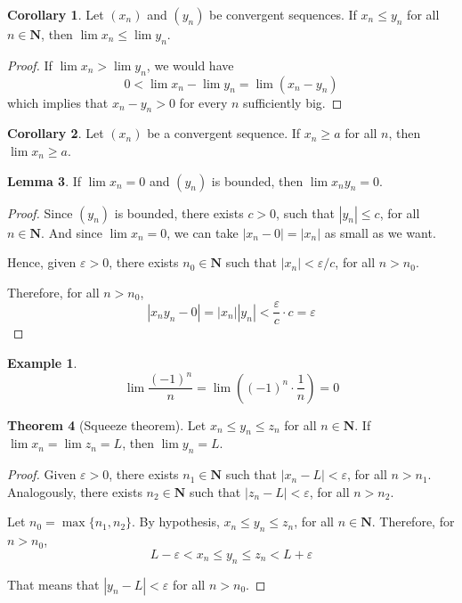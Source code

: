 \documentclass[tikz,12pt,a4paper]{article}
\theoremstyle{definition}
\newtheorem{theorem}{Theorem}[section]
\newtheorem{corollary}[theorem]{Corollary}
\newtheorem{lemma}[theorem]{Lemma}
\newtheorem{example}{Example}[section]
\begin{document}
\begin{corollary}
	Let $(x_n)$ and $(y_n)$ be convergent sequences. If $x_n \leq y_n$ for all $n \in \textbf{N}$, then $\lim x_n \leq \lim y_n$.
\end{corollary}
\begin{proof}
	If $\lim x_n > \lim y_n$, we would have \[ 0 < \lim x_n - \lim y_n = \lim (x_n - y_n) \] which implies that $x_n - y_n > 0$ for every $n$ sufficiently big.
\end{proof}

\begin{corollary}
	Let $(x_n)$ be a convergent sequence. If $x_n \geq a$ for all $n$, then $\lim x_n \geq a$.
\end{corollary}

\begin{lemma}\label{zeroandbound}
	If $\lim x_n = 0$ and $(y_n)$ is bounded, then $\lim x_n y_n = 0$.
\end{lemma}

\begin{proof}
	Since $(y_n)$ is bounded, there exists $c > 0$, such that $|y_n| \leq c$, for all $n \in \textbf{N}$. And since $\lim x_n = 0$, we can take $|x_n - 0| = |x_n|$ as small as we want.
	
	Hence, given $\varepsilon > 0$, there exists $n_0 \in \textbf{N}$ such that $|x_n| < \varepsilon / c$, for all $n > n_0$.
	
	Therefore, for all $n > n_0$, 
	\[
		|x_n y_n - 0| = |x_n| |y_n| < \frac{\varepsilon}{c} \cdot c = \varepsilon
	\]
\end{proof}

\begin{example}
	\[ \lim \frac{(-1)^n}{n} = \lim \left( (-1)^n \cdot \frac{1}{n} \right) = 0 \]
\end{example}

\begin{theorem}[Squeeze theorem]
	Let $x_n \leq y_n \leq z_n$ for all $n \in \textbf{N}$. If $\lim x_n = \lim z_n = L$, then $\lim y_n = L$.
\end{theorem}

\begin{proof}
	Given $\varepsilon > 0$, there exists $n_1 \in \textbf{N}$ such that $|x_n - L| < \varepsilon$, for all $n > n_1$. Analogously, there exists $n_2 \in \textbf{N}$ such that $|z_n - L| < \varepsilon$, for all $n > n_2$.
	
	Let $n_0 = \max \{n_1, n_2\}$. By hypothesis, $x_n \leq y_n \leq z_n$, for all $n \in \textbf{N}$. Therefore, for $n > n_0$, \[ L - \varepsilon < x_n \leq y_n \leq z_n < L + \varepsilon \]
	
	That means that $|y_n - L| < \varepsilon$ for all $n > n_0$.
\end{proof}
\end{document}
